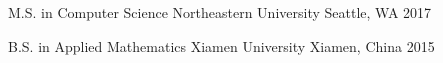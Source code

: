 


\begin{cvhonors}


\cvhonor
{M.S. in Computer Science} %
{Northeastern University} %
{Seattle, WA} %
{2017} %
    

\cvhonor
{B.S. in Applied Mathematics} %
{Xiamen University} %
{Xiamen, China} %
{2015} %


\end{cvhonors}